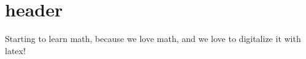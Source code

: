 \documentclass{article}
\begin{document}
\section*{header}

Starting to learn math, because we love math, and we love to digitalize it with latex!
\end{document}
